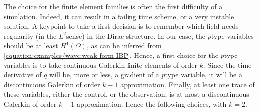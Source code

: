 \documentclass[letterpaper,10pt,english]{sphinxmanual}
\begin{document}
\begin{sphinxVerbatim}[commandchars=\\\{\}]
\PYG{p}{]}

   
\end{sphinxVerbatim}

\sphinxAtStartPar
The choice for the finite element families is often the first difficulty
of a simulation. Indeed, it can result in a failing time scheme, or a
very instable solution. A key\sphinxhyphen{}point to take a first decision is to
remember which field needs regularity (in the \(L^2\)\sphinxhyphen{}sense) in the
Dirac structure. In our case, the \(p\)\sphinxhyphen{}type variables should be at
least \(H^1(\Omega)\), as can be inferred from \eqref{equation:examples/wave:weak-form-IBP}.
Hence, a first choice for the \(p\)\sphinxhyphen{}type variables is to take
continuous Galerkin finite elements of order \(k\). Since the time
derivative of \(q\) will be, more or less, a gradient of a
\(p\)\sphinxhyphen{}type variable, it will be a discontinuous Galerkin of order
\(k-1\) approximation. Finally, at least one trace of these
variables, either the control, or the observation, is at most a
discontinuous Galerkin of order \(k-1\) approximation. Hence the
following choices, with \(k=2\).
\end{document}
